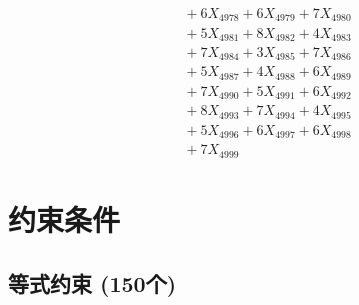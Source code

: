 \documentclass[a4paper,10pt]{article}
\begin{document}
{\begin{align}
&\;  + 6 X_{4978} + 6 X_{4979} + 7 X_{4980} \\[0.3ex]
&\;  + 5 X_{4981} + 8 X_{4982} + 4 X_{4983} \\[0.3ex]
&\;  + 7 X_{4984} + 3 X_{4985} + 7 X_{4986} \\[0.3ex]
&\;  + 5 X_{4987} + 4 X_{4988} + 6 X_{4989} \\[0.5ex]\allowbreak
&\;  + 7 X_{4990} + 5 X_{4991} + 6 X_{4992} \\[0.3ex]
&\;  + 8 X_{4993} + 7 X_{4994} + 4 X_{4995} \\[0.3ex]
&\;  + 5 X_{4996} + 6 X_{4997} + 6 X_{4998} \\[0.3ex]
&\;  + 7 X_{4999}\nonumber
\end{align}
}

\section{约束条件}

\subsection{等式约束 (150个)}
\end{document}
